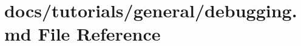 \hypertarget{debugging_8md}{}\section{docs/tutorials/general/debugging.md File Reference}
\label{debugging_8md}
